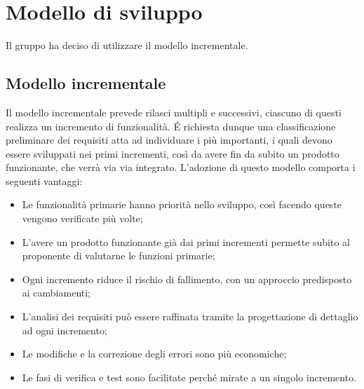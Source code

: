 \section{Modello di sviluppo}
Il gruppo ha deciso di utilizzare il modello incrementale.
\subsection{Modello incrementale}
Il modello incrementale prevede rilasci multipli e successivi, ciascuno di questi realizza un incremento di funzionalità.
É richiesta dunque una classificazione preliminare dei requisiti atta ad individuare i più importanti, i quali devono essere sviluppati nei primi incrementi, così da avere fin da subito un prodotto funzionante, che verrà via via integrato.
L'adozione di questo modello comporta i seguenti vantaggi:
\begin{itemize}
\item Le funzionalità primarie hanno priorità nello sviluppo, così facendo queste vengono verificate più volte;
\item L'avere un prodotto funzionante già dai primi incrementi permette subito al proponente di valutarne le funzioni primarie;
\item Ogni incremento riduce il rischio di fallimento, con un approccio predisposto ai cambiamenti;
\item L'analisi dei requisiti può essere raffinata tramite la progettazione di dettaglio ad ogni incremento;
\item Le modifiche e la correzione degli errori sono più economiche;
\item Le fasi di verifica e test sono facilitate perché mirate a un singolo incremento.
\end{itemize}
